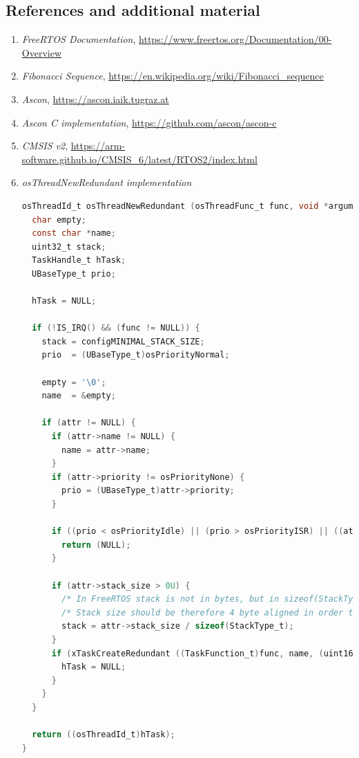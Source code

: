 \documentclass[a4paper, 12pt]{article}
\begin{document}
\begin{onehalfspace}
\section{References and additional material}
\begin{enumerate} 
    \item \textit{FreeRTOS Documentation}, \url{https://www.freertos.org/Documentation/00-Overview}\label{url:freertos_doc}
    \item \textit{Fibonacci Sequence}, \url{https://en.wikipedia.org/wiki/Fibonacci_sequence}\label{url:fibonacci_sequence}
    \item \textit{Ascon}, \url{https://ascon.iaik.tugraz.at}\label{url:ascon}
    \item \textit{Ascon C implementation}, \url{https://github.com/ascon/ascon-c}\label{url:ascon_code}
    \item \textit{CMSIS v2}, \url{https://arm-software.github.io/CMSIS_6/latest/RTOS2/index.html}\label{url:cmsis_v2}
    \item {\textit{osThreadNewRedundant implementation}
    \begin{lstlisting}[language=C]
osThreadId_t osThreadNewRedundant (osThreadFunc_t func, void *argument, const osThreadAttr_t *attr) {
  char empty;
  const char *name;
  uint32_t stack;
  TaskHandle_t hTask;
  UBaseType_t prio;

  hTask = NULL;

  if (!IS_IRQ() && (func != NULL)) {
    stack = configMINIMAL_STACK_SIZE;
    prio  = (UBaseType_t)osPriorityNormal;

    empty = '\0';
    name  = &empty;

    if (attr != NULL) {
      if (attr->name != NULL) {
        name = attr->name;
      }
      if (attr->priority != osPriorityNone) {
        prio = (UBaseType_t)attr->priority;
      }

      if ((prio < osPriorityIdle) || (prio > osPriorityISR) || ((attr->attr_bits & osThreadJoinable) == osThreadJoinable)) {
        return (NULL);
      }

      if (attr->stack_size > 0U) {
        /* In FreeRTOS stack is not in bytes, but in sizeof(StackType_t) which is 4 on ARM ports.       */
        /* Stack size should be therefore 4 byte aligned in order to avoid division caused side effects */
        stack = attr->stack_size / sizeof(StackType_t);
      }
      if (xTaskCreateRedundant ((TaskFunction_t)func, name, (uint16_t)stack, argument, prio, &hTask) != pdPASS) {
        hTask = NULL;
      }
    }
  }

  return ((osThreadId_t)hTask);
}
    \end{lstlisting}\label{code:osthreadnewredundant}}

\end{enumerate}

\end{onehalfspace}
\end{document}

